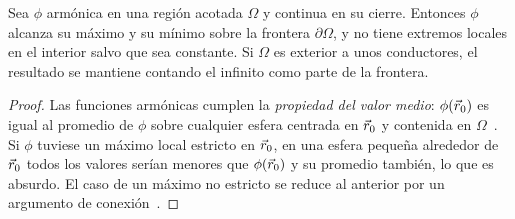 \begin{lema}\label{lem:maximo}
Sea $\phi$ armónica en una región acotada $\Omega$ y continua en su cierre. Entonces $\phi$ alcanza su máximo y su mínimo sobre la frontera
$\partial\Omega$, y no tiene extremos locales en el interior salvo que sea constante. Si $\Omega$ es exterior a unos conductores, el resultado se
mantiene contando el infinito como parte de la frontera.
\end{lema}
\begin{proof}
Las funciones armónicas cumplen la \emph{propiedad del valor medio}: $\phi(\vec{r}_0)$ es igual al promedio de $\phi$ sobre cualquier esfera centrada
en $\vec{r}_0$ y contenida en $\Omega$~\cite{GRIFFITHS,KELLOGG}. Si $\phi$ tuviese un máximo local estricto en $\vec{r}_0$, en una esfera pequeña alrededor de
$\vec{r}_0$ todos los valores serían menores que $\phi(\vec{r}_0)$ y su promedio también, lo que es absurdo. El caso de un máximo no estricto se reduce
al anterior por un argumento de conexión~\cite{KELLOGG}.
\end{proof}

